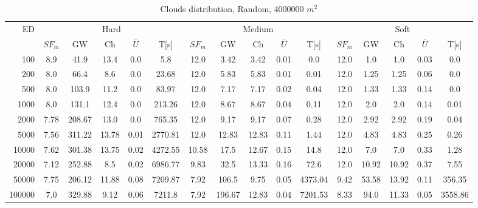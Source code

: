 \begin{table}[htb]
	\centering
	\footnotesize
	\begin{tabular}{|r|c|c|c|c|c|c|c|c|c|c|c|c|c|c|c|} 
		\hline
		\multirow{2}{*}{ED} & \multicolumn{5}{c|}{Hard} & \multicolumn{5}{c|}{Medium} &\multicolumn{5}{c|}{Soft} \\ 
		\cline{2-16} 
		&$SF_{m}$&GW & Ch & $\overline{U}$&T[s] &$SF_{m}$&GW & Ch & $\overline{U}$ &T[s] &$SF_{m}$&GW & Ch & $\overline{U}$  & T[s]  \\ 
		\hline 
		100 & 8.9 & 41.9 & 13.4 & 0.0 & 5.8 & 12.0 & 3.42 & 3.42 & 0.01 & 0.0 & 12.0 & 1.0 & 1.0 & 0.03 & 0.0\\ 
		200 & 8.0 & 66.4 & 8.6 & 0.0 & 23.68 & 12.0 & 5.83 & 5.83 & 0.01 & 0.01 & 12.0 & 1.25 & 1.25 & 0.06 & 0.0\\ 
		500 & 8.0 & 103.9 & 11.2 & 0.0 & 83.97 & 12.0 & 7.17 & 7.17 & 0.02 & 0.04 & 12.0 & 1.33 & 1.33 & 0.14 & 0.0\\ 
		1000 & 8.0 & 131.1 & 12.4 & 0.0 & 213.26 & 12.0 & 8.67 & 8.67 & 0.04 & 0.11 & 12.0 & 2.0 & 2.0 & 0.14 & 0.01\\ 
		2000 & 7.78 & 208.67 & 13.0 & 0.0 & 765.35 & 12.0 & 9.17 & 9.17 & 0.07 & 0.28 & 12.0 & 2.92 & 2.92 & 0.19 & 0.04\\ 
		5000 & 7.56 & 311.22 & 13.78 & 0.01 & 2770.81 & 12.0 & 12.83 & 12.83 & 0.11 & 1.44 & 12.0 & 4.83 & 4.83 & 0.25 & 0.26\\ 
		10000 & 7.62 & 301.38 & 13.75 & 0.02 & 4272.55 & 10.58 & 17.5 & 12.67 & 0.15 & 14.8 & 12.0 & 7.0 & 7.0 & 0.33 & 1.28\\ 
		20000 & 7.12 & 252.88 & 8.5 & 0.02 & 6986.77 & 9.83 & 32.5 & 13.33 & 0.16 & 72.6 & 12.0 & 10.92 & 10.92 & 0.37 & 7.55\\ 
		50000 & 7.75 & 206.12 & 11.88 & 0.08 & 7209.87 & 7.92 & 106.5 & 9.75 & 0.05 & 4373.04 & 9.42 & 53.58 & 13.92 & 0.11 & 356.35\\ 
		100000 & 7.0 & 329.88 & 9.12 & 0.06 & 7211.8 & 7.92 & 196.67 & 12.83 & 0.04 & 7201.53 & 8.33 & 94.0 & 11.33 & 0.05 & 3558.86\\ 
		\hline 
	\end{tabular} 
	\caption{Clouds distribution, Random, 4000000 $m^2$} 
	\label{tab:UnRandom2000} 
\end{table} 
